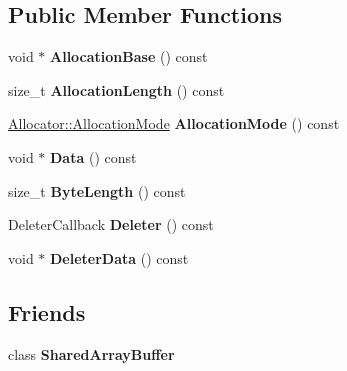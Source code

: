 \subsection*{Public Member Functions}
\begin{DoxyCompactItemize}
\item 
\mbox{\label{classv8_1_1SharedArrayBuffer_1_1Contents_a0a17b70f92830caf87f23cd3dc276489}} 
void $\ast$ {\bfseries Allocation\+Base} () const
\item 
\mbox{\label{classv8_1_1SharedArrayBuffer_1_1Contents_a5d3facf7b33602f5bd8d6641c15a626a}} 
size\+\_\+t {\bfseries Allocation\+Length} () const
\item 
\mbox{\label{classv8_1_1SharedArrayBuffer_1_1Contents_ae0ad06b6417e2e66cc903f230dffbfe5}} 
\mbox{\hyperlink{classv8_1_1ArrayBuffer_1_1Allocator_ab106d1fbad7be9f6fd8b0f5c550ac59e}{Allocator\+::\+Allocation\+Mode}} {\bfseries Allocation\+Mode} () const
\item 
\mbox{\label{classv8_1_1SharedArrayBuffer_1_1Contents_a8a795e7b725530f608c83528e5d4193b}} 
void $\ast$ {\bfseries Data} () const
\item 
\mbox{\label{classv8_1_1SharedArrayBuffer_1_1Contents_a3678ae4afdb9884a5beeab644966382b}} 
size\+\_\+t {\bfseries Byte\+Length} () const
\item 
\mbox{\label{classv8_1_1SharedArrayBuffer_1_1Contents_aa53c887a604cb1fc79e485cb7c765847}} 
Deleter\+Callback {\bfseries Deleter} () const
\item 
\mbox{\label{classv8_1_1SharedArrayBuffer_1_1Contents_ac3d565b291b4090206db8f2ab80876c5}} 
void $\ast$ {\bfseries Deleter\+Data} () const
\end{DoxyCompactItemize}
\subsection*{Friends}
\begin{DoxyCompactItemize}
\item 
\mbox{\label{classv8_1_1SharedArrayBuffer_1_1Contents_a35ac2a80dda42f728b7b1dfc4c3cc040}} 
class {\bfseries Shared\+Array\+Buffer}
\end{DoxyCompactItemize}


